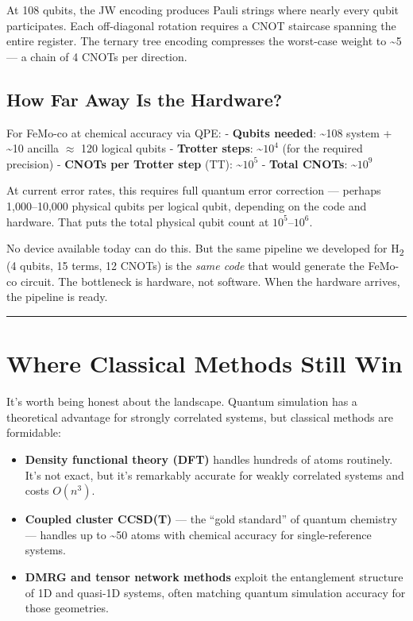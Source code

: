 \documentclass[
  11pt,
  oneside]{book}
\providecommand{\tightlist}{%
  \setlength{\itemsep}{0pt}\setlength{\parskip}{0pt}}
\begin{document}
At 108 qubits, the JW encoding produces Pauli strings where nearly every
qubit participates. Each off-diagonal rotation requires a CNOT staircase
spanning the entire register. The ternary tree encoding compresses the
worst-case weight to \textasciitilde5 --- a chain of 4 CNOTs per
direction.

\subsection{How Far Away Is the
Hardware?}\label{how-far-away-is-the-hardware}

For FeMo-co at chemical accuracy via QPE: - \textbf{Qubits needed}:
\textasciitilde108 system + \textasciitilde10 ancilla $\approx$ 120 logical
qubits - \textbf{Trotter steps}: \textasciitilde{}\(10^4\) (for the
required precision) - \textbf{CNOTs per Trotter step} (TT):
\textasciitilde{}\(10^5\) - \textbf{Total CNOTs}:
\textasciitilde{}\(10^9\)

At current error rates, this requires full quantum error correction ---
perhaps 1,000--10,000 physical qubits per logical qubit, depending on
the code and hardware. That puts the total physical qubit count at
\(10^5\)--\(10^6\).

No device available today can do this. But the same pipeline we
developed for H\textsubscript{2} (4 qubits, 15 terms, 12 CNOTs) is the \emph{same code}
that would generate the FeMo-co circuit. The bottleneck is hardware, not
software. When the hardware arrives, the pipeline is ready.

\begin{center}\rule{0.5\linewidth}{0.5pt}\end{center}

\section{Where Classical Methods Still
Win}\label{where-classical-methods-still-win}

It's worth being honest about the landscape. Quantum simulation has a
theoretical advantage for strongly correlated systems, but classical
methods are formidable:

\begin{itemize}
\tightlist
\item
  \textbf{Density functional theory (DFT)} handles hundreds of atoms
  routinely. It's not exact, but it's remarkably accurate for weakly
  correlated systems and costs \(O(n^3)\).
\item
  \textbf{Coupled cluster CCSD(T)} --- the ``gold standard'' of quantum
  chemistry --- handles up to \textasciitilde50 atoms with chemical
  accuracy for single-reference systems.
\item
  \textbf{DMRG and tensor network methods} exploit the entanglement
  structure of 1D and quasi-1D systems, often matching quantum
  simulation accuracy for those geometries.
\end{itemize}
\end{document}

